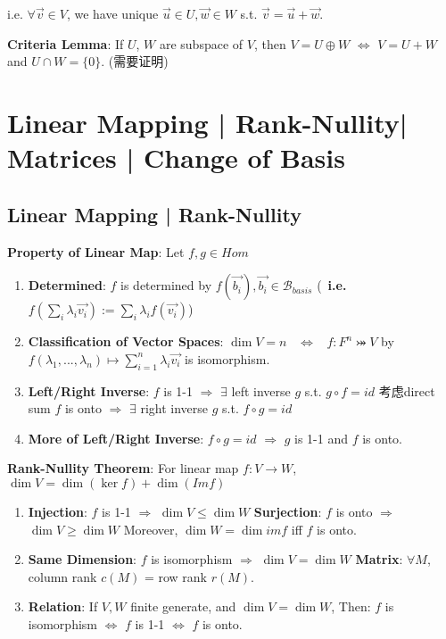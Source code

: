 \documentclass[9pt]{article}
\begin{document}
\quad \quad \quad \quad \quad \quad \quad \quad i.e. $\forall\vec{v}\in V$, we have unique $\vec{u}\in U,\vec{w}\in W$ s.t. $\vec{v}=\vec{u}+\vec{w}$. 

\textbf{Criteria Lemma}: If $U$, $W$ are subspace of $V$, then $V=U\oplus W$ $\Leftrightarrow$ $V=U+W$ and $U\cap W=\{0\}$. {\scriptsize (需要证明)}


\section{Linear Mapping | Rank-Nullity| Matrices | Change of Basis }

\subsection{Linear Mapping | Rank-Nullity} %

\textbf{Property of Linear Map}: Let $f,g\in Hom$

\begin{enumerate}[itemsep=-2pt, topsep=-2pt]
    \item \textbf{Determined}: $f$ is determined by $f(\vec{b_i}),\vec{b_i}\in \mathcal{B}_{basis}$ {\footnotesize (\star \ \textbf{i.e.} $f(\sum_{i}\lambda_i\vec{v_i}):=\sum_{i}\lambda_if(\vec{v_i})$)}
    \item \textbf{Classification of Vector Spaces}: $\dim V=n$ \ $\Leftrightarrow$ \ $f:F^n\bij V$ by $f(\lambda_1,...,\lambda_n)\mapsto\sum_{i=1}^{n}\lambda_i\vec{v_i}$ is isomorphism.
    \item \textbf{Left/Right Inverse}: $f$ is 1-1 $\Rightarrow$ $\exists$ left inverse $g$ s.t. $g\circ f=id$ {\scriptsize 考虑direct sum} \quad \quad $f$ is onto $\Rightarrow$ $\exists$ right inverse $g$ s.t. $f\circ g=id$
    \item \np\textbf{More of Left/Right Inverse}: $f\circ g=id$ $\Rightarrow$ $g$ is 1-1 and $f$ is onto. 
\end{enumerate}

\textbf{Rank-Nullity Theorem}: For linear map $f:V\to W$, $\dim V=\dim(\ker f)+\dim(Im f)$ \quad \quad {}

\begin{enumerate}[itemsep=-2pt, topsep=-2pt]
    \item \textbf{Injection}: $f$ is 1-1 $\Rightarrow$ $\dim V \leq \dim W$ \quad \textbf{Surjection}: $f$ is onto $\Rightarrow$ $\dim V \geq \dim W$ \quad Moreover, $\dim W=\dim imf$ iff $f$ is onto.
    \item \textbf{Same Dimension}: {\small $f$ is isomorphism $\Rightarrow$ $\dim V=\dim W$} \quad \quad \quad \textbf{Matrix}: $\forall M$, column rank $c(M)$ = row rank $r(M)$.
    \item \textbf{Relation}: {\small If $V,W$ finite generate, and $\dim V=\dim W$, \quad Then: $f$ is isomorphism $\Leftrightarrow$ $f$ is 1-1 $\Leftrightarrow$ $f$ is onto.}
\end{enumerate}
\end{document}
